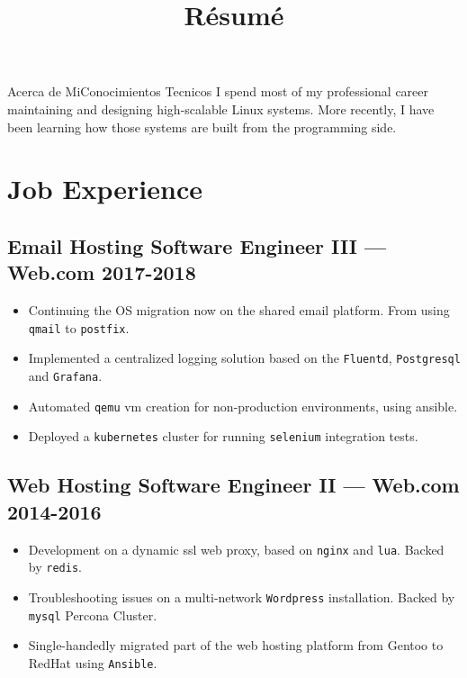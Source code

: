 \documentclass[11pt]{article}
\begin{document}
\title{R\'esum\'e}
\author{\FULLNAME}

\maketitle

\makeabout
    {Acerca de Mi}{Conocimientos Tecnicos}
    {
      I spend most of my professional career maintaining and designing high-scalable Linux systems.
      More recently, I have been learning how those systems are built from the programming side.
    }

\section{Job Experience}


\subsection{Email Hosting Software Engineer III --- Web.com \hfill 2017-2018}
\begin{itemize}
\item Continuing the OS migration now on the shared email platform. From using \texttt{qmail} to \texttt{postfix}.
\item Implemented a centralized logging solution based on the \texttt{Fluentd}, \texttt{Postgresql} and \texttt{Grafana}.
\item Automated \texttt{qemu} vm creation for non-production environments, using ansible.
\item Deployed a \texttt{kubernetes} cluster for running \texttt{selenium} integration tests.
\end{itemize}

\subsection{Web Hosting Software Engineer II --- Web.com \hfill 2014-2016}
\begin{itemize}
\item Development on a dynamic ssl web proxy, based on \texttt{nginx} and \texttt{lua}. Backed by \texttt{redis}.
\item Troubleshooting issues on a multi-network \texttt{Wordpress} installation. Backed by \texttt{mysql} Percona Cluster.
\item Single-handedly migrated part of the web hosting platform from Gentoo to RedHat using \texttt{Ansible}.
\end{itemize}
\end{document}
